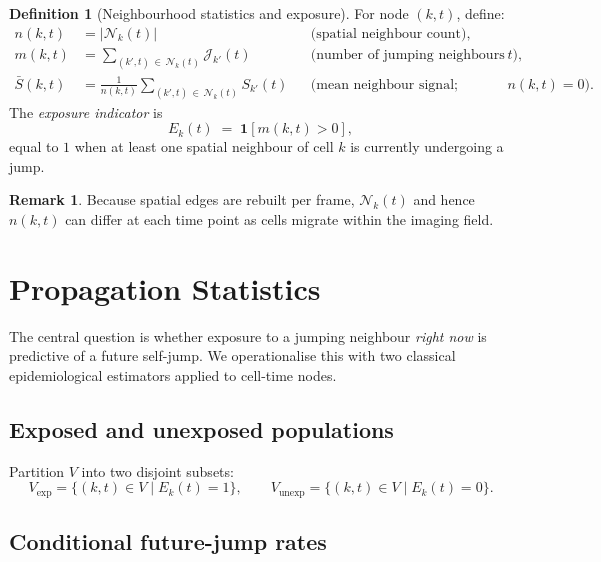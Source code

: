 \documentclass[11pt,a4paper]{article}
\theoremstyle{definition}
\newtheorem{definition}{Definition}[section]
\newtheorem{remark}{Remark}[section]
\theoremstyle{plain}
\newcommand{\sig}[2]{S_{#1}(#2)}
\newcommand{\Nb}[2]{\mathcal{N}_{#1}(#2)}
\newcommand{\JE}[2]{\mathcal{J}_{#1}(#2)}
\newcommand{\expo}[2]{E_{#1}(#2)}
\newcommand{\1}[1]{\mathbf{1}\!\left[#1\right]}
\begin{document}
\begin{definition}[Neighbourhood statistics and exposure]\label{def:exposure}
For node $(k,t)$, define:
\begin{align}
  n(k,t)       &= |\Nb{k}{t}|
    && \text{(spatial neighbour count),} \label{eq:n}\\[3pt]
  m(k,t)       &= \sum_{(k',t)\,\in\,\Nb{k}{t}} \JE{k'}{t}
    && \text{(number of jumping neighbours at frame $t$),} \label{eq:m}\\[3pt]
  \bar{S}(k,t) &= \frac{1}{n(k,t)}
                   \sum_{(k',t)\,\in\,\Nb{k}{t}} \sig{k'}{t}
    && \text{(mean neighbour signal; undefined if $n(k,t)=0$).} \label{eq:Sbar}
\end{align}
The \emph{exposure indicator} is
\[
  \expo{k}{t} \;=\; \1{m(k,t) > 0},
\]
equal to $1$ when at least one spatial neighbour of cell $k$ is currently
undergoing a jump.
\end{definition}

\begin{remark}
Because spatial edges are rebuilt per frame, $\Nb{k}{t}$ and hence $n(k,t)$
can differ at each time point as cells migrate within the imaging field.
\end{remark}

\section{Propagation Statistics}

The central question is whether exposure to a jumping neighbour
\emph{right now} is predictive of a future self-jump. We operationalise this
with two classical epidemiological estimators applied to cell-time nodes.

\subsection{Exposed and unexposed populations}

Partition $V$ into two disjoint subsets:
\[
  V_{\mathrm{exp}}   = \{(k,t) \in V \mid \expo{k}{t} = 1\},\qquad
  V_{\mathrm{unexp}} = \{(k,t) \in V \mid \expo{k}{t} = 0\}.
\]

\subsection{Conditional future-jump rates}
\end{document}
